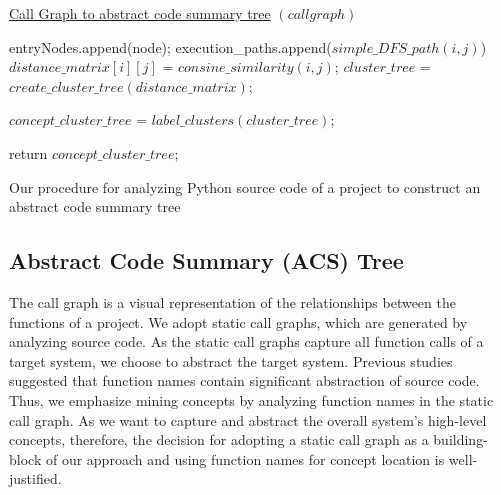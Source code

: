 \label{approach}

\begin{algorithm}
    
    \underline{Call Graph to abstract code summary tree} $(call graph)$\;
    
    {
        {
            entryNodes.append(node);
        }
    } 
    {
        {
            execution\_paths.append($simple\_DFS\_path(i, j)$)
        }
    }
    {
        {
            $distance\_matrix[i][j]$ = $consine\_similarity(i,j)$;
        }
    }
    $cluster\_tree$ = $create\_cluster\_tree(distance\_matrix)$;
    
    $concept\_cluster\_tree$ = $label\_clusters(cluster\_tree)$;
    
    return $concept\_cluster\_tree$;
    \caption{Our procedure for analyzing Python source code of a project to construct an abstract code summary tree}
    \label{hla1:alg:overall}
\end{algorithm}

\subsection{Abstract Code Summary (ACS) Tree }
\label{hla1:approach_acs}
The call graph is a visual representation of the relationships between the functions of a project. We adopt static call graphs, which are generated by analyzing source code. As the static call
graphs capture all function calls of a target system, we
choose to abstract the target system. Previous studies suggested that function names contain significant abstraction of source code. Thus, we emphasize mining concepts by analyzing function names in the static call graph.
As we want to capture and abstract the overall system's high-level concepts, therefore, the decision for adopting a static call graph as a building-block of our approach and using function names for concept location is well-justified.  

